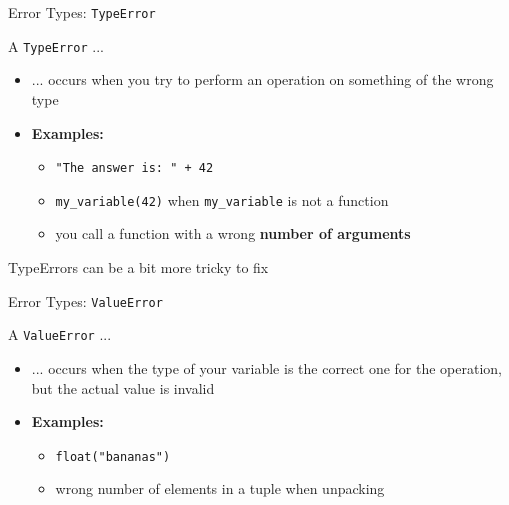 \begin{frame}{Error Types: \texttt{TypeError}}

    A \texttt{TypeError} ...
    \begin{itemize}
        \item ... occurs when you try to perform an operation on something of the wrong type
        \item \textbf{Examples:}
        \begin{itemize}
            \item \texttt{"The answer is: " + 42}
            \item \texttt{my\_variable(42)} when \texttt{my\_variable} is not a function
            \item you call a function with a wrong \textbf{number of arguments}
        \end{itemize}
    \end{itemize}

    \vspace{1em}

    TypeErrors can be a bit more tricky to fix

\end{frame}

\begin{frame}{Error Types: \texttt{ValueError}}

    A \texttt{ValueError} ...
    \begin{itemize}
        \item ... occurs when the type of your variable is the correct one for the operation, but the actual value is invalid
        \item \textbf{Examples:}
        \begin{itemize}
            \item \texttt{float("bananas")}
            \item wrong number of elements in a tuple when unpacking
        \end{itemize}
    \end{itemize}


\end{frame}

